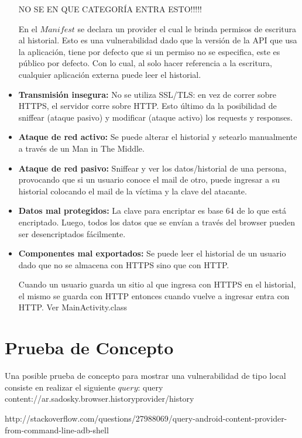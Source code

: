 \documentclass[10pt, a4paper]{article}
\begin{document}
\begin{itemize}
NO SE EN QUE CATEGORÍA ENTRA ESTO!!!!!

En el $Manifest$ se declara un provider el cual le brinda permisos de escritura al historial. Esto es una vulnerabilidad dado que la versión de la API que usa la aplicación, tiene por defecto que si un permiso no se especifica, este es público por defecto. Con lo cual, al solo hacer referencia a la escritura, cualquier aplicación externa puede leer el historial.



\item \textbf{Transmisión insegura:} No se utiliza SSL/TLS: en vez de correr sobre HTTPS, el servidor corre sobre HTTP. Esto último da la posibilidad de sniffear (ataque pasivo) y modificar (ataque activo) los requests y responses.

\item \textbf{Ataque de red activo:} Se puede alterar el historial y setearlo manualmente a través de un Man in The Middle.

\item \textbf{Ataque de red pasivo:} Sniffear y ver los datos/historial de una persona, provocando que si un usuario conoce el mail de otro, puede ingresar a su historial colocando el mail de la víctima y la clave del atacante.

\item \textbf{Datos mal protegidos:} La clave para encriptar es base 64 de lo que está encriptado. Luego, todos los datos que se envían a través del browser pueden ser desencriptados fácilmente. 

\item \textbf{Componentes mal exportados:} Se puede leer el historial de un usuario dado que no se almacena con HTTPS sino que con HTTP.

Cuando un usuario guarda un sitio al que ingresa con HTTPS en el historial, el mismo se guarda con HTTP entonces cuando vuelve a ingresar entra con HTTP. Ver MainActivity.class

\end{itemize}

\section{Prueba de Concepto}

Una posible prueba de concepto para mostrar una vulnerabilidad de tipo local consiste en realizar el siguiente $query$:
query content://ar.sadosky.browser.historyprovider/history

http://stackoverflow.com/questions/27988069/query-android-content-provider-from-command-line-adb-shell
\end{document}

